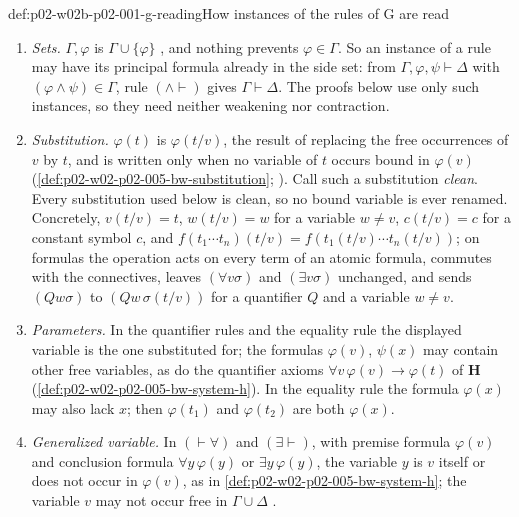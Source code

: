 \begin{hbconvention}{def:p02-w02b-p02-001-g-reading}{How instances of the rules of G are read}
\begin{enumerate}
\item \emph{Sets.}  \(\Gamma,\varphi\) is \(\Gamma\cup\{\varphi\}\)
      \cite[ch.~A.1, \S4, p.~37]{Barwise1977FirstOrder}, and nothing
      prevents \(\varphi\in\Gamma\).  So an instance of a rule may have its
      principal formula already in the side set: from
      \(\Gamma,\varphi,\psi\vdash\Delta\) with \((\varphi\land\psi)\in\Gamma\),
      rule \((\land\vdash)\) gives \(\Gamma\vdash\Delta\).  The proofs below
      use only such instances, so they need neither weakening nor
      contraction.
\item \emph{Substitution.}  \(\varphi(t)\) is \(\varphi(t/v)\), the result
      of replacing the free occurrences of \(v\) by \(t\), and is written
      only when no variable of \(t\) occurs bound in \(\varphi(v)\)
      (\cref{def:p02-w02-p02-005-bw-substitution};
      \cite[ch.~A.1, \S3, p.~22]{Barwise1977FirstOrder}).  Call such a
      substitution \emph{clean}.  Every substitution used below is clean,
      so no bound variable is ever renamed.  Concretely,
      \(v(t/v)=t\), \(w(t/v)=w\) for a variable \(w\neq v\), \(c(t/v)=c\) for
      a constant symbol \(c\), and
      \(f(t_1\cdots t_n)(t/v)=f(t_1(t/v)\cdots t_n(t/v))\); on formulas the
      operation acts on every term of an atomic formula, commutes with the
      connectives, leaves \((\forall v\sigma)\) and \((\exists v\sigma)\)
      unchanged, and sends \((Qw\sigma)\) to \((Qw\,\sigma(t/v))\) for a
      quantifier \(Q\) and a variable \(w\neq v\).
\item \emph{Parameters.}  In the quantifier rules and the equality rule the
      displayed variable is the one substituted for; the formulas
      \(\varphi(v)\), \(\psi(x)\) may contain other free variables, as do
      the quantifier axioms \(\forall v\,\varphi(v)\to\varphi(t)\) of
      \(\mathbf H\) (\cref{def:p02-w02-p02-005-bw-system-h}).  In the
      equality rule the formula \(\varphi(x)\) may also lack \(x\); then
      \(\varphi(t_1)\) and \(\varphi(t_2)\) are both \(\varphi(x)\).
\item \emph{Generalized variable.}  In \((\vdash\forall)\) and
      \((\exists\vdash)\), with premise formula \(\varphi(v)\) and conclusion
      formula \(\forall y\,\varphi(y)\) or \(\exists y\,\varphi(y)\), the
      variable \(y\) is \(v\) itself or does not occur in \(\varphi(v)\), as
      in \cref{def:p02-w02-p02-005-bw-system-h}; the variable \(v\) may not
      occur free in \(\Gamma\cup\Delta\)
      \cite[ch.~A.1, \S4, p.~39]{Barwise1977FirstOrder}.
\end{enumerate}
\end{hbconvention}

